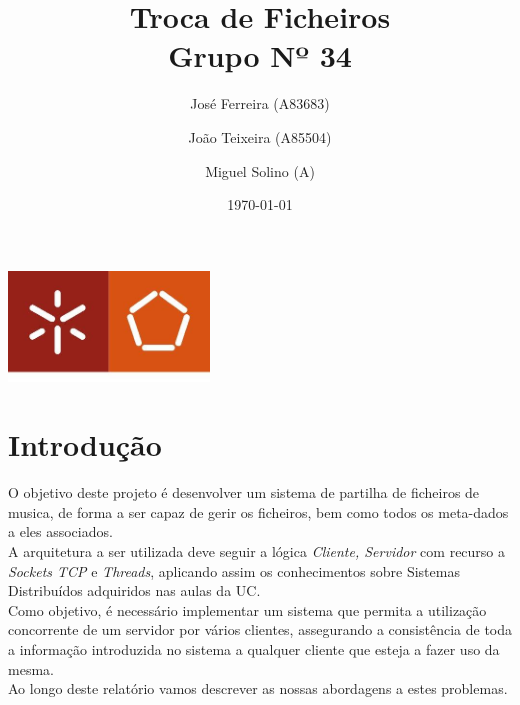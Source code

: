 \documentclass[a4paper]{report}
\begin{document}
\title{Troca de Ficheiros\\ 
\large Grupo Nº 34}
\author{José Ferreira (A83683) \and João Teixeira (A85504) \and Miguel Solino (A)}
\date{\today}

\begin{center}
    \begin{minipage}{0.75\linewidth}
        \centering
        \includegraphics[width=0.4\textwidth]{eng.jpeg}\par\vspace{1cm}
        \vspace{1.5cm}
        \href{https://www.uminho.pt/PT}
        {\color{black}{\scshape\LARGE Universidade do Minho}} \par
        \vspace{1cm}
        \href{https://www.di.uminho.pt/}
        {\color{black}{\scshape\Large Departamento de Informática}} \par
        \vspace{1.5cm}
        \maketitle
    \end{minipage}
\end{center}

\tableofcontents

\pagebreak
\chapter{Introdução}
O objetivo deste projeto é desenvolver um sistema de partilha de ficheiros de 
musica, de forma a ser capaz de gerir os ficheiros, bem como todos os meta-dados
a eles associados.\\
A arquitetura a ser utilizada deve seguir a lógica \textit{Cliente, Servidor}
com recurso a \textit{Sockets TCP} e \textit{Threads}, aplicando assim os
conhecimentos sobre Sistemas Distribuídos adquiridos nas aulas da UC.\\
Como objetivo, é necessário implementar um sistema que permita a utilização 
concorrente de um servidor por vários clientes, assegurando a consistência
de toda a informação introduzida no sistema a qualquer cliente que esteja
a fazer uso da mesma.\\
Ao longo deste relatório vamos descrever as nossas abordagens a estes problemas.
\end{document}
